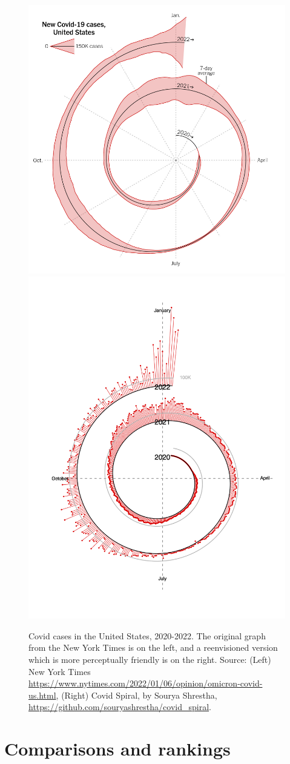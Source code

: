 \documentclass[article]{jdssv}\usepackage[]{graphicx}\usepackage[]{color}
\begin{document}
\begin{figure}\centering
\includegraphics[width=.45\linewidth]{nyt-spiral}\hfill\includegraphics[width=.45\linewidth]{spiral-rework}
\caption{Covid cases in the United States, 2020-2022. The original graph from the New York Times is on the left, and a reenvisioned version which is more perceptually friendly is on the right. Source: (Left) New York Times \url{https://www.nytimes.com/2022/01/06/opinion/omicron-covid-us.html}, (Right) Covid Spiral, by Sourya Shrestha, \url{https://github.com/souryashrestha/covid_spiral}.}
\label{fig:nyt-spiral}
\end{figure}




\section[]{Comparisons and rankings}
\label{sec:rankings}
\end{document}
